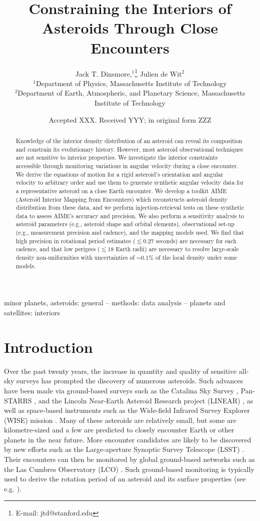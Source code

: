 \documentclass[fleqn,usenatbib]{mnras}
\title[Flyby Constraints on Asteroids Interiors]{Constraining the Interiors of Asteroids Through Close Encounters}
\author[Jack T. Dinsmore, Julien de Wit]{
Jack T. Dinsmore,$^{1}$\thanks{E-mail: jtd@stanford.edu}
Julien de Wit$^{2}$
\\
$^{1}$Department of Physics, Massachusetts Institute of Technology\\
$^{2}$Department of Earth, Atmospheric, and Planetary Science, Massachusetts Institute of Technology
}
\date{Accepted XXX. Received YYY; in original form ZZZ}
\begin{document}
\label{firstpage}
\pagerange{\pageref{firstpage}--\pageref{lastpage}}
\maketitle


\begin{abstract}
  Knowledge of the interior density distribution of an asteroid can reveal its composition and constrain its evolutionary history. However, most asteroid observational techniques are not sensitive to interior properties. We investigate the interior constraints accessible through monitoring variations in angular velocity during a close encounter. We derive the equations of motion for a rigid asteroid's orientation and angular velocity to arbitrary order and use them to generate synthetic angular velocity data for a representative asteroid on a close Earth encounter. We develop a toolkit AIME (Asteroid Interior Mapping from Encounters) which reconstructs asteroid density distribution from these data, and we perform injection-retrieval tests on these synthetic data to assess AIME's accuracy and precision. We also perform a sensitivity analysis to asteroid parameters (e.g., asteroid shape and orbital elements), observational set-up (e.g., measurement precision and cadence), and the mapping models used. We find that high precision in rotational period estimates ($\lesssim 0.27$ seconds) are necessary for each cadence, and that low perigees ($\lesssim 18$ Earth radii) are necessary to resolve large-scale density non-uniformities with uncertainties of $\sim 0.1\%$ of the local density under some models.
\end{abstract}

\begin{keywords}
  minor planets, asteroids: general -- methods: data analysis -- planets and satellites: interiors
\end{keywords}


\section{Introduction}

Over the past twenty years, the increase in quantity and quality of sensitive all-sky surveys has prompted the discovery of numerous asteroids. Such advances have been made via ground-based surveys such as the Catalina Sky Survey \citep{larson1998catalina}, Pan-STARRS \citep{kaiser2002pan}, and the Lincoln Near-Earth Asteroid Research project (LINEAR) \citep{stokes2000lincoln}, as well as space-based instruments such as the Wide-field Infrared Survey Explorer (WISE) mission \citep{wright2010wide}. Many of these asteroids are relatively small, but some are kilometre-sized and a few are predicted to closely encounter Earth or other planets in the near future. More encounter candidates are likely to be discovered by new efforts such as the Large-aperture Synoptic Survey Telescope (LSST) \citep{tyson2002large}. Their encounters can then be monitored by global ground-based networks such as the Las Cumbres Observatory (LCO) \citep{brown2013cumbres}. Such ground-based monitoring is typically used to derive the rotation period of an asteroid and its surface properties (see e.g. \cite{10.1093/mnras/stab1252}).
\end{document}
